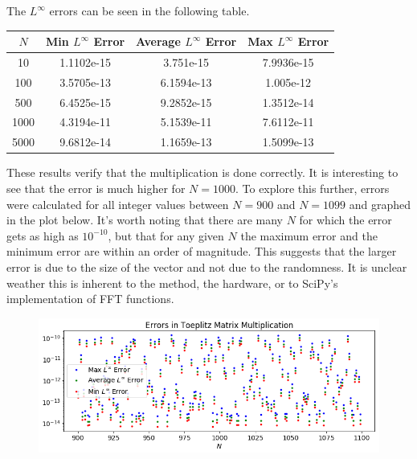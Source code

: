 \documentclass[12pt]{article}
\begin{document}
The $L^\infty$ errors can be seen in the following table.
\begin{center}
	\begin{tabular}{|c|c|c|c|}
		\hline
		$N$&Min $L^\infty$ Error&Average $L^\infty$ Error&Max $L^\infty$ Error\\ \hline
		10&1.1102e-15&3.751e-15&7.9936e-15\\ \hline
		100&3.5705e-13&6.1594e-13&1.005e-12\\ \hline
		500&6.4525e-15&9.2852e-15&1.3512e-14\\ \hline
		1000&4.3194e-11&5.1539e-11&7.6112e-11\\ \hline
		5000&9.6812e-14&1.1659e-13&1.5099e-13\\ \hline
	\end{tabular}
\end{center}
These results verify that the multiplication is done correctly. It is interesting to see that the error is much higher for $N=1000$. To explore this further, errors were calculated for all integer values between $N=900$ and $N=1099$ and graphed in the plot below. It's worth noting that there are many $N$ for which the error gets as high as $10^{-10}$, but that for any given $N$ the maximum error and the minimum error are within an order of magnitude. This suggests that the larger error is due to the size of the vector and not due to the randomness. It is unclear weather this is inherent to the method, the hardware, or to SciPy's implementation of FFT functions.

\begin{figure}[H]
	\includegraphics[width=1\textwidth]{hw02_p2_b_toeplitz_mult_errors}
	\centering
\end{figure}

\bigbreak
\end{document}
